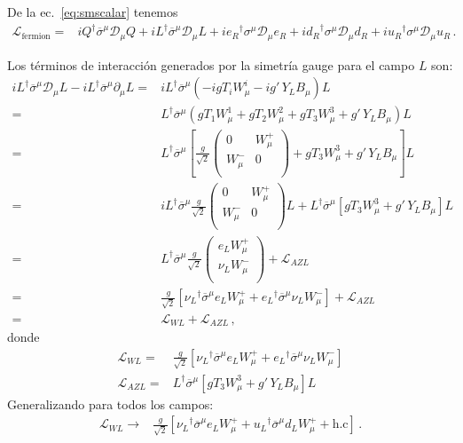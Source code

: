 \begin{frame}
De la ec.~\eqref{eq:smscalar} tenemos
\begin{align}
  \label{eq:lfermion}
  \mathcal{L}_{\text{fermion}}=&i Q^{\dagger}\overline{\sigma}^\mu\mathcal{D}_\mu Q+i L^{\dagger}\overline{\sigma}^\mu\mathcal{D}_\mu L+
i{e_R}^{\dagger}\sigma^\mu\mathcal{D}_\mu {e_R}+i{d_R}^{\dagger}\sigma^\mu\mathcal{D}_\mu {d_R}+i{u_R}^{\dagger}\sigma^\mu\mathcal{D}_\mu {u_R}\,.
\end{align}

Los términos de interacción generados por la simetría gauge para el campo $L$ son:
\begin{align}
  i L^{\dagger}\overline{\sigma}^\mu\mathcal{D}_\mu L-i L^{\dagger}\overline{\sigma}^\mu\partial_\mu L
=&i L^{\dagger}\overline{\sigma}^\mu(-i g T_iW_\mu^i-i g'\,Y_LB_\mu) L\nonumber\\
=& L^{\dagger}\overline{\sigma}^\mu(g T_1W_\mu^1+ g T_2W_\mu^2+g T_3W_\mu^3+g'\,Y_LB_\mu) L\nonumber\\
=& L^{\dagger}\overline{\sigma}^\mu\left[\frac{g}{\sqrt{2}}
  \begin{pmatrix}
0 & W_\mu^+\\
W_\mu^- & 0\\    
  \end{pmatrix}
+g T_3W_\mu^3+g'\,Y_LB_\mu
\right]L\nonumber\\
=&i L^{\dagger}\overline{\sigma}^\mu\frac{g}{\sqrt{2}}
  \begin{pmatrix}
0 & W_\mu^+\\
W_\mu^- & 0\\    
  \end{pmatrix}L+
 L^{\dagger}\overline{\sigma}^\mu\left[g T_3W_\mu^3+g'\,Y_LB_\mu
\right]L\nonumber\\
  =& L^{\dagger}\overline{\sigma}^\mu\frac{g}{\sqrt{2}}
  \begin{pmatrix}
e_LW_\mu^+\\
\nu_L W_\mu^-\\    
  \end{pmatrix}+\mathcal{L}_{A Z L}\nonumber\\
  =&
\frac{g}{\sqrt{2}}\left[{\nu_L}^{\dagger}\overline{\sigma}^\mu e_LW_\mu^++
{e_L}^{\dagger}\overline{\sigma}^\mu\nu_L W_\mu^-\right]    
+\mathcal{L}_{A Z L}\nonumber\\
  =&
\mathcal{L}_{W L}    
+\mathcal{L}_{A Z L}\,,
\end{align}
donde
\begin{align}
  \mathcal{L}_{W L}=&\frac{g}{\sqrt{2}}\left[{\nu_L}^{\dagger}\overline{\sigma}^\mu e_LW_\mu^++
{e_L}^{\dagger}\overline{\sigma}^\mu\nu_L W_\mu^-\right]\nonumber\\    
  \mathcal{L}_{A Z L}=& L^{\dagger}\overline{\sigma}^\mu\left[g T_3W_\mu^3+g'\,Y_LB_\mu\right]L
\end{align}
Generalizando para todos los campos:
\begin{align}
  \label{eq:wl}
   \mathcal{L}_{W L}\to&\frac{g}{\sqrt{2}}\left[{\nu_L}^{\dagger}\overline{\sigma}^\mu e_LW_\mu^++
{u_L}^{\dagger}\overline{\sigma}^\mu d_LW_\mu^++\text{h.c}\right]\,.
\end{align}



\end{frame}
